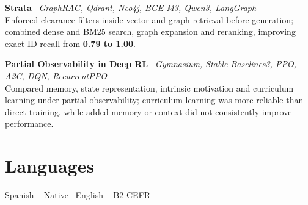 \documentclass[10pt,a4paper]{article}
\newcommand{\project}[3]{
  \textbf{#1} \textbar\ {\small\color{muted}\textit{#2}}\\[-1.5pt]
  #3\par\vspace{1pt}
}
\begin{document}
\project{\href{https://lucasfiz.dev/en/projects/strata}{Strata}}{GraphRAG, Qdrant, Neo4j, BGE-M3, Qwen3, LangGraph}{Enforced clearance filters inside vector and graph retrieval before generation; combined dense and BM25 search, graph expansion and reranking, improving exact-ID recall from \textbf{0.79 to 1.00}.}

\project{\href{https://lucasfiz.dev/en/projects/minigrid-tfg}{Partial Observability in Deep RL}}{Gymnasium, Stable-Baselines3, PPO, A2C, DQN, RecurrentPPO}{Compared memory, state representation, intrinsic motivation and curriculum learning under partial observability; curriculum learning was more reliable than direct training, while added memory or context did not consistently improve performance.}

\section{Languages}
Spanish -- Native \textbar\ English -- B2 CEFR
\end{document}

